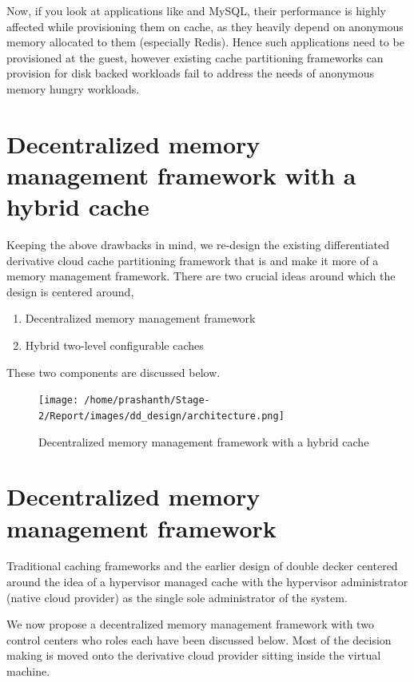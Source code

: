 	  Now, if you look at applications like \redis{} and MySQL, their performance is highly affected while provisioning
	  them on cache, as they heavily depend on anonymous memory allocated to them (especially Redis). Hence such applications
	  need to be provisioned at the guest, however existing cache partitioning frameworks 
	  \cite{koller2015centaur, schopp2006resizing} can provision for disk backed workloads fail to address the needs of 
	  anonymous memory hungry workloads.
	    

  \section{Decentralized memory management framework with a hybrid cache}
    
    Keeping the above drawbacks in mind, we re-design the existing differentiated derivative cloud cache partitioning
    framework that \dd{} is and make it more of a memory management framework. There are two crucial ideas around which
    the design is centered around,
    
    \begin{enumerate}
      \item Decentralized memory management framework
      \item Hybrid two-level configurable caches
    \end{enumerate}
    
    \noindent These two components are discussed below.
  
    \begin{figure}
      \centering
      \texttt{[image: /home/prashanth/Stage-2/Report/images/dd\_design/architecture.png]}
      \caption{Decentralized memory management framework with a hybrid cache}
      \label{plot:dd_architecture}
    \end{figure}
        
    \section{Decentralized memory management framework}
      Traditional caching frameworks and the earlier design of double decker centered around the idea 
      of a hypervisor managed cache with the hypervisor administrator (native cloud provider) as the single sole 
      administrator of the system.
      
      We now propose a decentralized memory management framework with two control centers 
      who roles each have been discussed below. Most of the decision making is moved onto the
      derivative cloud provider sitting inside the virtual machine.
	      
